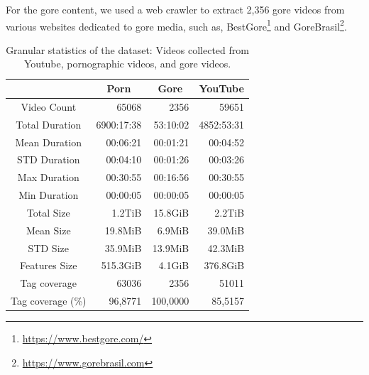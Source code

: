 For the gore content, we used a web crawler to extract 2,356 gore videos from various websites dedicated to gore media, such as, BestGore\footnote{\url{https://www.bestgore.com/}} and GoreBrasil\footnote{\url{https://www.gorebrasil.com}}. 

\begin{table}
\centering
\label{tab:granular-stats}
\caption{Granular statistics of the dataset: Videos collected from Youtube, pornographic videos, and gore videos.}
\begin{tabular}{c|r|r|r} 
\multicolumn{1}{l|}{} & \multicolumn{1}{c|}{Porn} & \multicolumn{1}{c|}{Gore} & \multicolumn{1}{c}{YouTube}  \\ 
\hline
Video Count           & 65068                     & 2356                      & 59651                         \\ 
\hline
Total Duration        & 6900:17:38                & 53:10:02                  & 4852:53:31                    \\ 
\hline
Mean Duration         & 00:06:21                  & 00:01:21                  & 00:04:52                      \\ 
\hline
STD Duration          & 00:04:10                  & 00:01:26                  & 00:03:26                      \\ 
\hline
Max Duration          & 00:30:55                  & 00:16:56                  & 00:30:55                      \\ 
\hline
Min Duration          & 00:00:05                  & 00:00:05                  & 00:00:05                      \\ 
\hline
Total Size            & 1.2TiB                    & 15.8GiB                   & 2.2TiB                        \\ 
\hline
Mean Size             & 19.8MiB                   & 6.9MiB                    & 39.0MiB                       \\ 
\hline
STD Size              & 35.9MiB                   & 13.9MiB                   & 42.3MiB                       \\ 
\hline
Features Size         & 515.3GiB                  & 4.1GiB                    & 376.8GiB                      \\ 
\hline
Tag coverage          & 63036                     & 2356                      & 51011                         \\ 
\hline
Tag coverage (\%)     & 96,8771                   & 100,0000                  & 85,5157                       \\
\end{tabular}
\end{table}

